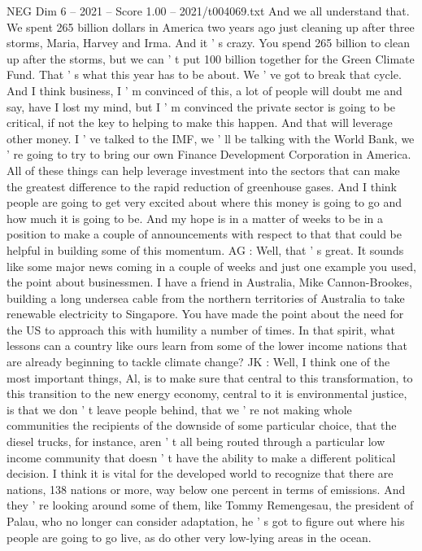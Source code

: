 \begin{textsample}{NEG Dim 6 – 2021 – Score 1.00 – 2021/t004069.txt}
And we all understand that.
We spent 265 billion dollars in America two years ago just cleaning up after three storms, Maria, Harvey and Irma.
And it ' s crazy.
You spend 265 billion to clean up after the storms, but we can ' t put 100 billion together for the Green Climate Fund.
That ' s what this year has to be about.
We ' ve got to break that cycle.
And I think business, I ' m convinced of this, a lot of people will doubt me and say, have I lost my mind, but I ' m convinced the private sector is going to be critical, if not the key to helping to make this happen.
And that will leverage other money.
I ' ve talked to the IMF, we ' ll be talking with the World Bank, we ' re going to try to bring our own Finance Development Corporation in America.
All of these things can help leverage investment into the sectors that can make the greatest difference to the rapid reduction of greenhouse gases.
And I think people are going to get very excited about where this money is going to go and how much it is going to be.
And my hope is in a matter of weeks to be in a position to make a couple of announcements with respect to that that could be helpful in building some of this momentum.
AG : Well, that ' s great.
It sounds like some major news coming in a couple of weeks and just one example you used, the point about businessmen.
I have a friend in Australia, Mike Cannon-Brookes, building a long undersea cable from the northern territories of Australia to take renewable electricity to Singapore.
You have made the point about the need for the US to approach this with humility a number of times.
In that spirit, what lessons can a country like ours learn from some of the lower income nations that are already beginning to tackle climate change?
JK : Well, I think one of the most important things, Al, is to make sure that central to this transformation, to this transition to the new energy economy, central to it is environmental justice, is that we don ' t leave people behind, that we ' re not making whole communities the recipients of the downside of some particular choice, that the diesel trucks, for instance, aren ' t all being routed through a particular low income community that doesn ' t have the ability to make a different political decision.
I think it is vital for the developed world to recognize that there are nations, 138 nations or more, way below one percent in terms of emissions.
And they ' re looking around some of them, like Tommy Remengesau, the president of Palau, who no longer can consider adaptation, he ' s got to figure out where his people are going to go live, as do other very low-lying areas in the ocean.

\end{textsample}

